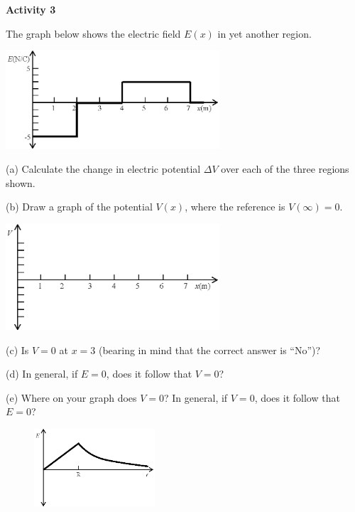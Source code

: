 \pagebreak
\textbf{Activity 3} 

The graph below shows the electric field $E(x)$ in yet another region.
\begin{center}
\includegraphics[width=0.6\textwidth]{finding_v_from_e/fig5.eps}
\end{center}

(a) Calculate the change in electric potential $\Delta V$ over each of the three regions shown.
\vspace{1.2in}

(b) Draw a graph of the potential $V(x)$, where the reference is $V(\infty)=0$.
\begin{center}
\includegraphics[width=0.6\textwidth]{finding_v_from_e/fig6.eps}
\end{center}

(c) Is $V=0$ at $x=3$ (bearing in mind that the correct answer is ``No'')?
\vspace{0.6in}

(d) In general, if $E=0$, does it follow that $V=0$?
\vspace{0.6in}

(e) Where on your graph does $V=0$?  In general, if $V=0$, does it follow that $E=0$?
\vspace{0.6in}

\pagebreak
\begin{figure}
    \includegraphics[width=0.4\textwidth]{finding_v_from_e/fig7.eps}
\end{figure}

